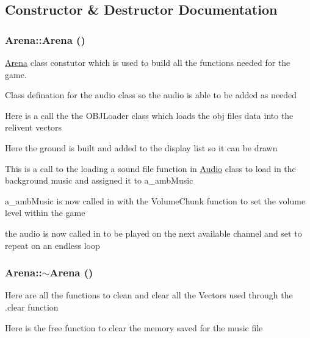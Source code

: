 \subsection{Constructor \& Destructor Documentation}
\hypertarget{classArena_a74f105bc709d4728fb07f1984abfd345}{
\subsubsection[{Arena}]{\setlength{\rightskip}{0pt plus 5cm}Arena::Arena ()}}
\label{classArena_a74f105bc709d4728fb07f1984abfd345}


\hyperlink{classArena}{Arena} class constutor which is used to build all the functions needed for the game. 

Class defination for the audio class so the audio is able to be added as needed

Here is a call the the OBJLoader class which loads the obj files data into the relivent vectors

Here the ground is built and added to the display list so it can be drawn

This is a call to the loading a sound file function in \hyperlink{classAudio}{Audio} class to load in the background music and assigned it to a\_\-ambMusic

a\_\-ambMusic is now called in with the VolumeChunk function to set the volume level within the game

the audio is now called in to be played on the next available channel and set to repeat on an endless loop \hypertarget{classArena_ae21b399e9e3f6b8ac4ecc44d7d1667fc}{
\subsubsection[{$\sim$Arena}]{\setlength{\rightskip}{0pt plus 5cm}Arena::$\sim$Arena ()}}
\label{classArena_ae21b399e9e3f6b8ac4ecc44d7d1667fc}


Here are all the functions to clean and clear all the Vectors used through the .clear function

Here is the free function to clear the memory saved for the music file 


